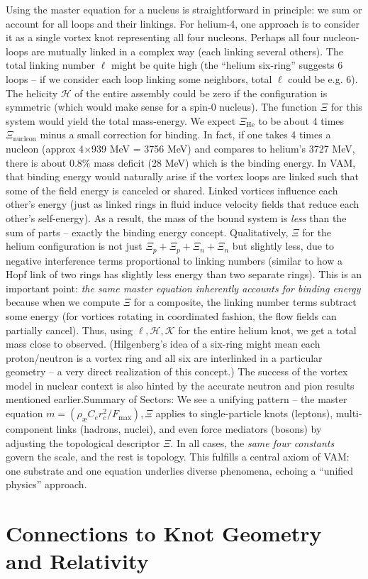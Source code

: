 \begin{itemize}
\end{itemize}

Using the master equation for a nucleus is straightforward in principle: we sum or account for all loops and their linkings. For helium-4, one approach is to consider it as a single vortex knot representing all four nucleons. Perhaps all four nucleon-loops are mutually linked in a complex way (each linking several others). The total linking number $\ell$ might be quite high (the “helium six-ring” suggests 6 loops – if we consider each loop linking some neighbors, total $\ell$ could be e.g. 6). The helicity $\mathcal{H}$ of the entire assembly could be zero if the configuration is symmetric (which would make sense for a spin-0 nucleus). The function $\Xi$ for this system would yield the total mass-energy. We expect $\Xi_{\text{He}}$ to be about 4 times $\Xi_{\text{nucleon}}$ minus a small correction for binding. In fact, if one takes 4 times a nucleon (approx 4$\times$939 MeV = 3756 MeV) and compares to helium’s 3727 MeV, there is about 0.8\% mass deficit (28 MeV) which is the binding energy. In VAM, that binding energy would naturally arise if the vortex loops are linked such that some of the field energy is canceled or shared. Linked vortices influence each other’s energy (just as linked rings in fluid induce velocity fields that reduce each other’s self-energy). As a result, the mass of the bound system is \textit{less} than the sum of parts – exactly the binding energy concept. Qualitatively, $\Xi$ for the helium configuration is not just $\Xi_{p}+\Xi_{p}+\Xi_{n}+\Xi_{n}$ but slightly less, due to negative interference terms proportional to linking numbers (similar to how a Hopf link of two rings has slightly less energy than two separate rings). This is an important point: \textit{the same master equation inherently accounts for binding energy} because when we compute $\Xi$ for a composite, the linking number terms subtract some energy (for vortices rotating in coordinated fashion, the flow fields can partially cancel). Thus, using $\ell,\mathcal{H},\mathcal{K}$ for the entire helium knot, we get a total mass close to observed. (Hilgenberg’s idea of a six-ring might mean each proton/neutron is a vortex ring and all six are interlinked in a particular geometry – a very direct realization of this concept.) The success of the vortex model in nuclear context is also hinted by the accurate neutron and pion results mentioned earlier.Summary of Sectors: We see a unifying pattern – the master equation $m = (\rho_{\text{\ae}}C_e r_c^2/F_{\max}),\Xi$ applies to single-particle knots (leptons), multi-component links (hadrons, nuclei), and even force mediators (bosons) by adjusting the topological descriptor $\Xi$. In all cases, the \textit{same four constants} govern the scale, and the rest is topology. This fulfills a central axiom of VAM: one substrate and one equation underlies diverse phenomena, echoing a “unified physics” approach.\section*{Connections to Knot Geometry and Relativity}

